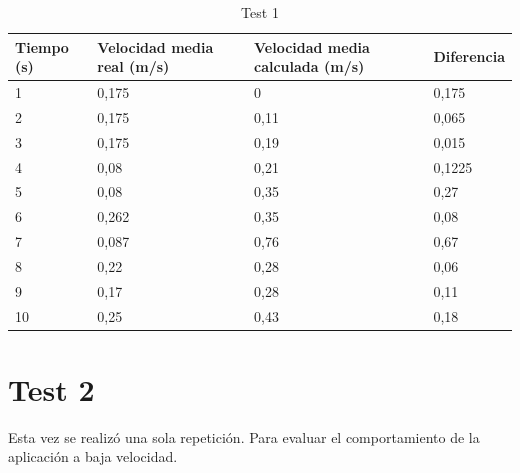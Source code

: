 \begin{table}[H]
\centering
\caption{Test 1}
\label{Test 1}
\begin{tabular}{|l|l|l|l|}
\hline
Tiempo (s) & Velocidad media real (m/s) & Velocidad media calculada (m/s) & Diferencia \\ \hline
1          & 0,175                      & 0                               & 0,175      \\ \hline
2          & 0,175                      & 0,11                            & 0,065      \\ \hline
3          & 0,175                      & 0,19                            & 0,015      \\ \hline
4          & 0,08                       & 0,21                            & 0,1225     \\ \hline
5          & 0,08                       & 0,35                            & 0,27       \\ \hline
6          & 0,262                      & 0,35                            & 0,08       \\ \hline
7          & 0,087                      & 0,76                            & 0,67       \\ \hline
8          & 0,22                       & 0,28                            & 0,06       \\ \hline
9          & 0,17                       & 0,28                            & 0,11       \\ \hline
10         & 0,25                       & 0,43                            & 0,18       \\ \hline
\end{tabular}
\end{table}

\section*{Test 2}

Esta vez se realizó una sola repetición. Para evaluar el comportamiento de la aplicación a baja velocidad.

